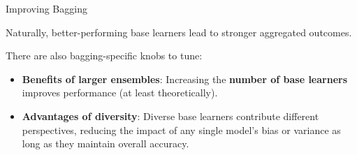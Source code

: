 \documentclass[11pt,compress,t,notes=noshow, xcolor=table]{beamer}
\begin{document}
\begin{vbframe}{Improving Bagging}

Naturally, better-performing base learners lead to stronger aggregated outcomes. \\

\vspace{2em}

There are also bagging-specific knobs to tune:
\begin{itemize}
  \item \textbf{Benefits of larger ensembles}: Increasing the \textbf{number of base learners} improves performance (at least theoretically). %
  \item \textbf{Advantages of diversity}: Diverse base learners contribute different perspectives, reducing the impact of any single model's bias or variance as long as they maintain overall accuracy.
\end{itemize}


\end{vbframe}
\end{document}
